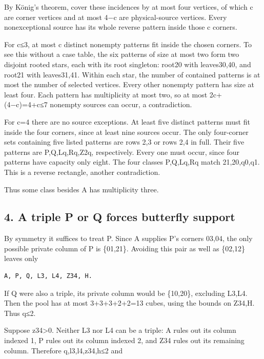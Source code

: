 \documentclass[
  10pt,
]{article}
\begin{document}
By König's theorem, cover these incidences by at most four vertices, of
which c are corner vertices and at most 4−c are physical-source
vertices. Every nonexceptional source has its whole reverse pattern
inside those c corners.

For c≤3, at most c distinct nonempty patterns fit inside the chosen
corners. To see this without a case table, the six patterns of size at
most two form two disjoint rooted stars, each with its root singleton:
root20 with leaves30,40, and root21 with leaves31,41. Within each star,
the number of contained patterns is at most the number of selected
vertices. Every other nonempty pattern has size at least four. Each
pattern has multiplicity at most two, so at most 2c+(4−c)=4+c≤7 nonempty
sources can occur, a contradiction.

For c=4 there are no source exceptions. At least five distinct patterns
must fit inside the four corners, since at least nine sources occur. The
only four-corner sets containing five listed patterns are rows 2,3 or
rows 2,4 in full. Their five patterns are P,Q,Lq,Rq,Z2q, respectively.
Every one must occur, since four patterns have capacity only eight. The
four classes P,Q,Lq,Rq match 21,20,q0,q1. This is a reverse rectangle,
another contradiction.

Thus some class besides A has multiplicity three.

\hypertarget{a-triple-p-or-q-forces-butterfly-support}{%
\subsection*{4. A triple P or Q forces butterfly
support}\label{a-triple-p-or-q-forces-butterfly-support}}

By symmetry it suffices to treat P. Since A supplies P's corners 03,04,
the only possible private column of P is \{01,21\}. Avoiding this pair
as well as \{02,12\} leaves only

\begin{verbatim}
A, P, Q, L3, L4, Z34, H.
\end{verbatim}

If Q were also a triple, its private column would be \{10,20\},
excluding L3,L4. Then the pool has at most 3+3+3+2+2=13 cubes, using the
bounds on Z34,H. Thus q≤2.

Suppose z34\textgreater0. Neither L3 nor L4 can be a triple: A rules out
its column indexed 1, P rules out its column indexed 2, and Z34 rules
out its remaining column. Therefore q,l3,l4,z34,h≤2 and
\end{document}
